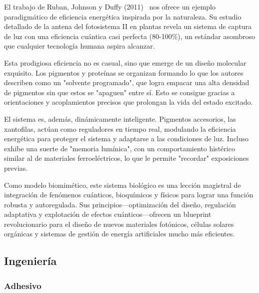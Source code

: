 \documentclass[twocolumn,amsmath,amssymb,aps,floatfix]{revtex4-2}
\begin{document}
El trabajo de Ruban, Johnson y Duffy (2011)~\cite{Ruban2011} nos ofrece un ejemplo paradigmático de eficiencia energética inspirada
por la naturaleza. Su estudio detallado de la antena del fotosistema II en plantas revela un sistema de captura de luz con una
eficiencia cuántica casi perfecta (80-100\%), un estándar asombroso que cualquier tecnología humana aspira alcanzar.

Esta prodigiosa eficiencia no es casual, sino que emerge de un diseño molecular exquisito. Los pigmentos y proteínas se organizan
formando lo que los autores describen como un "solvente programado", que logra empacar una alta densidad de pigmentos sin que estos
se "apaguen" entre sí. Esto se consigue gracias a orientaciones y acoplamientos precisos que prolongan la vida del estado excitado.

El sistema es, además, dinámicamente inteligente. Pigmentos accesorios, las xantofilas, actúan como reguladores en tiempo real,
modulando la eficiencia energética para proteger el sistema y adaptarse a las condiciones de luz. Incluso exhibe una suerte de
"memoria lumínica", con un comportamiento histérico similar al de materiales ferroeléctricos, lo que le permite "recordar"
exposiciones previas.

Como modelo biomimético, este sistema biológico es una lección magistral de integración de fenómenos cuánticos, bioquímicos y
físicos para lograr una función robusta y autoregulada. Sus principios—optimización del diseño, regulación adaptativa y explotación
de efectos cuánticos—ofrecen un blueprint revolucionario para el diseño de nuevos materiales fotónicos, células solares orgánicas y
sistemas de gestión de energía artificiales mucho más eficientes.



\subsection{Ingeniería}

\subsubsection{Adhesivo}
\end{document}
